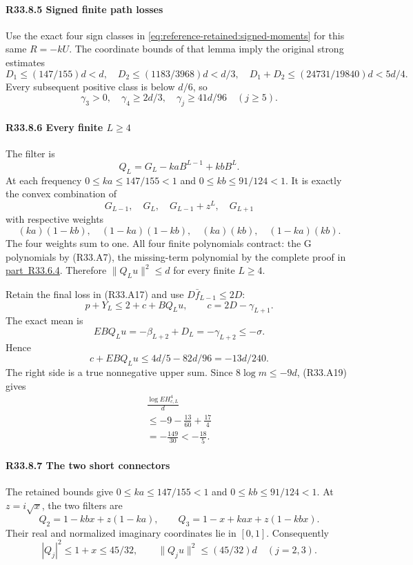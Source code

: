 \paragraph{R33.8.5 Signed finite path losses}
Use the exact four sign classes in
\eqref{eq:reference-retained:signed-moments} for this same \(R=-kU\).
The coordinate bounds of that lemma imply the original strong estimates
\[
 D_1\le(147/155)d<d,\quad D_2\le(1183/3968)d<d/3,
 \quad D_1+D_2\le(24731/19840)d<5d/4.\tag{R33.A61}
\]
Every subsequent positive class is below \(d/6\), so
\[
 \gamma_3>0,\quad\gamma_4\ge2d/3,\quad
 \gamma_j\ge41d/96\quad(j\ge5).\tag{R33.A62}
\]

\paragraph{R33.8.6 Every finite \(L\ge 4\)}

The filter is
\[
Q_L=G_L-kaB^{L-1}+kbB^L.
\]
At each frequency \(0\le ka\le147/155<1\) and
\(0\le kb\le91/124<1\). It is exactly the convex combination of
\[
G_{L-1},\quad G_L,\quad G_{L-1}+z^L,\quad G_{L+1}
\]
with respective weights
\[
(ka)(1-kb),\quad(1-ka)(1-kb),\quad(ka)(kb),\quad(1-ka)(kb).
\]
The four weights sum to one. All four finite polynomials contract:
the G polynomials by (R33.A7), the missing-term polynomial by the
complete proof in \mbox{\hyperref[part:R33.6.4]{part R33.6.4}}.
Therefore \(\|Q_Lu\|^2\le d\) for every finite \(L\ge 4.\)

Retain the final loss in (R33.A17) and use \(D\bar f_{L-1}\le2D\):
\[
p+Y_L\le2+c+BQ_Lu,\qquad c=2D-\gamma_{L+1}.
\]
The exact mean is
\[
EBQ_Lu=-\beta_{L+2}+D_L=-\gamma_{L+2}\le-\sigma.
\]
Hence
\[
c+EBQ_Lu\le4d/5-82d/96=-13d/240.
\]
The right side is a true nonnegative upper sum. Since
\(8\log m\le-9d\), (R33.A19) gives
\[
\begin{gathered}
\frac{\log EH_{c,L}^4}{d}\\
\le-9-\frac{13}{60}+\frac{17}{4}\\
=-\frac{149}{30}<-\frac{18}{5}.
\end{gathered}\tag{R33.A63}
\]

\paragraph{R33.8.7 The two short connectors}
The retained bounds give \(0\le ka\le147/155<1\) and
\(0\le kb\le91/124<1\). At \(z=i\sqrt x\), the two filters are
\[
 Q_2=1-kbx+z(1-ka),\qquad
 Q_3=1-x+kax+z(1-kbx).
\]
Their real and normalized imaginary coordinates lie in \([0,1]\).
Consequently
\[
 |Q_j|^2\le1+x\le45/32,\qquad
 \|Q_ju\|^2\le(45/32)d\quad(j=2,3).                 \tag{R33.A64}
\]

